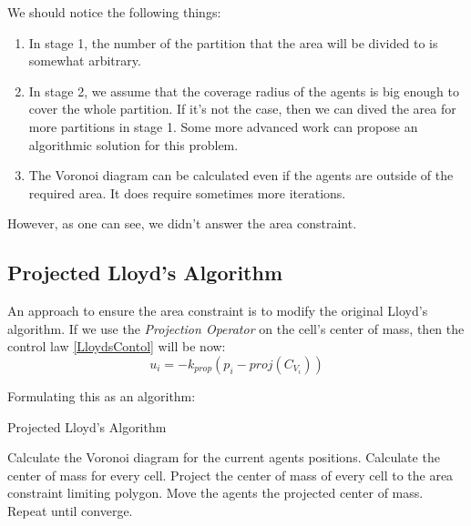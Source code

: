 \documentclass{iacas}
\begin{document}
We should notice the following things:
\begin{enumerate}
\item In stage 1, the number of the partition that the area will be divided to is somewhat arbitrary.
\item In stage 2, we assume that the coverage radius of the agents is big enough to cover the whole partition. If it's not the case, then we can dived the area for more partitions in stage 1. Some more advanced work can propose an algorithmic solution for this problem.
\item The Voronoi diagram can be calculated even if the agents are outside of the required area. It does require sometimes more iterations.
\end{enumerate}

However, as one can see, we didn't answer the area constraint.
\subsection{Projected Lloyd's Algorithm}
An approach to ensure the area constraint is to modify the original Lloyd's algorithm. If we use the \emph{Projection Operator} on the cell's center of mass, then the control law \ref{LloydsContol} will be now:
\begin{equation} \label{ProjectedLloydsContol}
u_{i} = -k_{prop}\left( p_i - \textit{proj}\left( C_{V_{i}} \right) \right)
\end{equation} 

Formulating this as an algorithm:
\begin{algorithm}
\caption{Projected Lloyd's Algorithm}\label{ProjLloydsAlgorithm}
\begin{algorithmic}[1]
\State Calculate the Voronoi diagram for the current agents positions.
\State Calculate the center of mass for every cell.
\State Project the center of mass of every cell to the area constraint limiting polygon.
\State Move the agents the projected center of mass.
\State Repeat until converge.
\end{algorithmic}
\end{algorithm}

\end{document}

